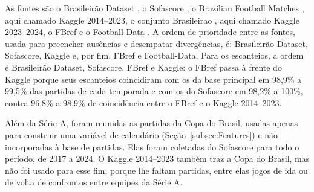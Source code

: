 \begin{table}[htb]
\end{table}

As fontes são o Brasileirão Dataset \cite{brasileiraoDatasetGithub}, o Sofascore \cite{sofascore}, o Brazilian Football Matches \cite{brazilianFootballMatches}, aqui chamado Kaggle 2014--2023, o conjunto Brasileirao \cite{kaggleBrasileirao2324}, aqui chamado Kaggle 2023--2024, o FBref \cite{fbref} e o Football-Data \cite{footballData}. A ordem de prioridade entre as fontes, usada para preencher ausências e desempatar divergências, é: Brasileirão Dataset, Sofascore, Kaggle e, por fim, FBref e Football-Data. Para os escanteios, a ordem é Brasileirão Dataset, Sofascore, FBref e Kaggle: o FBref passa à frente do Kaggle porque seus escanteios coincidiram com os da base principal em 98,9\% a 99,5\% das partidas de cada temporada e com os do Sofascore em 98,2\% a 100\%, contra 96,8\% a 98,9\% de coincidência entre o FBref e o Kaggle 2014--2023.

Além da Série A, foram reunidas as partidas da Copa do Brasil, usadas apenas para construir uma variável de calendário (Seção~\ref{subsec:Features}) e não incorporadas à base de partidas. Elas foram coletadas do Sofascore para todo o período, de 2017 a 2024. O Kaggle 2014--2023 também traz a Copa do Brasil, mas não foi usado para esse fim, porque lhe faltam partidas, entre elas jogos de ida ou de volta de confrontos entre equipes da Série A.


